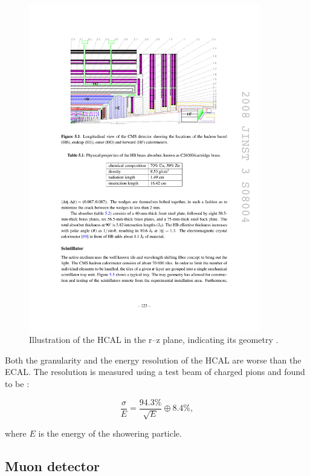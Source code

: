 \begin{figure}[htbp]
   \includegraphics[width=0.9\textwidth]{plots/detector/hcal_layout.pdf}
\caption[Illustration of the HCAL in the r--z plane, indicating its
geometry.]
{Illustration of the \ac{HCAL} in the r--z plane, indicating its geometry \cite{Chatrchyan:2008aa}.}
\label{fig:hcal}
\end{figure}

Both the granularity and the energy resolution of the \ac{HCAL} are worse than
the \ac{ECAL}. The resolution is measured using a test beam of charged pions and
found to be \cite{Abdullin:2009zz}:

\begin{equation}
\frac{\sigma}{E} = \frac{94.3\%}{\sqrt{E}} \oplus 8.4\%,
\end{equation}

where $E$ is the energy of the showering particle. 

\subsection{Muon detector}
\label{sec:muondetector}


